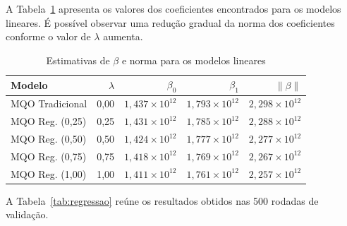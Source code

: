 \documentclass[conference]{IEEEtran}
\begin{document}
A Tabela~\ref{tab:estimativas_beta} apresenta os valores dos coeficientes encontrados para os modelos lineares. É possível observar uma redução gradual da norma dos coeficientes conforme o valor de $\lambda$ aumenta.

\begin{table}[htbp]
\caption{Estimativas de $\beta$ e norma para os modelos lineares}
\label{tab:estimativas_beta}
\centering
\begin{tabular}{lrrrr}
\toprule
Modelo & $\lambda$ & $\beta_0$ & $\beta_1$ & $\|\beta\|$ \\
\midrule
MQO Tradicional & 0,00 & $1,437\times10^{12}$ & $1,793\times10^{12}$ & $2,298\times10^{12}$ \\
MQO Reg. (0,25) & 0,25 & $1,431\times10^{12}$ & $1,785\times10^{12}$ & $2,288\times10^{12}$ \\
MQO Reg. (0,50) & 0,50 & $1,424\times10^{12}$ & $1,777\times10^{12}$ & $2,277\times10^{12}$ \\
MQO Reg. (0,75) & 0,75 & $1,418\times10^{12}$ & $1,769\times10^{12}$ & $2,267\times10^{12}$ \\
MQO Reg. (1,00) & 1,00 & $1,411\times10^{12}$ & $1,761\times10^{12}$ & $2,257\times10^{12}$ \\
\bottomrule
\end{tabular}
\end{table}

A Tabela~\ref{tab:regressao} reúne os resultados obtidos nas 500 rodadas de validação.

\begin{table}[htbp]
\caption{Desempenho dos modelos de regressão ($R=500$ rodadas)}
\label{tab:regressao}
\centering
{}
\end{table}
\end{document}
